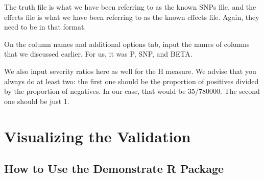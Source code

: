 \documentclass[twoside,a4paper]{refart}
\begin{document}
The truth file is what we have been referring to as the known SNPs file, and the effects file is what we have been referring to as the known effects file. Again, they need to be in that format. 

On the column names and additional options tab, input the names of columns that we discussed earlier. For us, it was P, SNP, and BETA. 

\begin{center}
\end{center} 

We also input severity ratios here as well for the H measure. We advise that you always do at least two: the first one should be the proportion of positives divided by the proportion of negatives. In our case, that would be 35/780000. The second one should be just 1. 

\section{Visualizing the Validation}

\subsection{How to Use the Demonstrate R Package}
\end{document}

